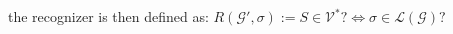 \documentclass[portrait,a0b,final,a4resizeable]{a0poster}
\def\jointspacing{\vspace{0.3in}}
\begin{document}
\begin{poster}
\begin{multicols}{2}
{      \vspace{1cm}\null\hspace*{3cm}\begin{minipage}[c]{0.90\columnwidth}
        the recognizer is then defined as: $R(\mathcal{G}', \sigma) := S \in \mathcal{V}^*? \Longleftrightarrow \sigma \in \mathcal{L}(\mathcal{G})?$
      \end{minipage}
      }

      \jointspacing



\end{multicols}
\end{poster}
\end{document}
